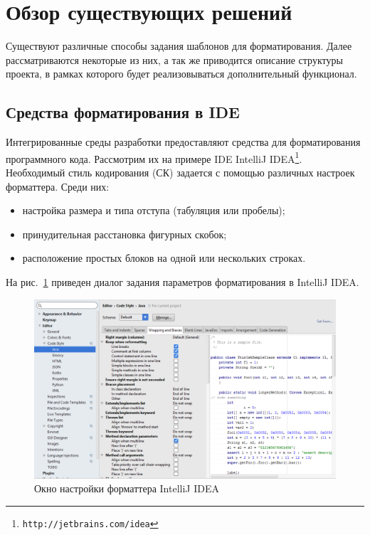 \section{Обзор существующих решений}
Существуют различные способы задания шаблонов для форматирования. Далее рассматриваются некоторые из них, а так же приводится описание структуры проекта, в рамках которого будет реализовываться дополнительный функционал.

\subsection{Средства форматирования в IDE}
Интегрированные среды разработки предоставляют средства для форматирования программного кода. Рассмотрим их на примере IDE IntelliJ IDEA\footnote{\texttt{http://jetbrains.com/idea}}. Необходимый стиль кодирования (СК) задается с помощью различных настроек форматтера. Среди них:
\begin{itemize}
  \item настройка размера и типа отступа (табуляция или пробелы);
  \item принудительная расстановка фигурных скобок;
  \item расположение простых блоков на одной или нескольких строках.
\end{itemize}

На рис.~\ref{fig:intellijSettings} приведен диалог задания параметров форматирования в IntelliJ IDEA.

\begin{figure}[h!]
	\centering
	\includegraphics[width=\textwidth]{images/intellijSettings}
	\caption{Окно настройки форматтера IntelliJ IDEA}
	\label{fig:intellijSettings}
\end{figure}

